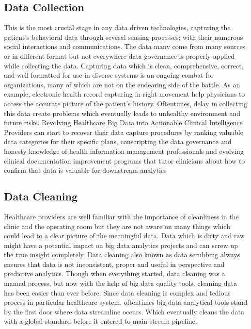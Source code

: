 \documentclass[sigconf]{acmart}
\begin{document}
\subsection{Data Collection} This is the most crucial stage in any data driven technologies, capturing the patient’s behavioral data through several sensing processes; with their numerous social interactions and communications.  The data many come from many sources or in different format but not everywhere data governance is properly applied while collecting the data. Capturing data which is clean, comprehensive, correct, and well formatted for use in diverse systems is an ongoing combat for organizations, many of which are not on the endearing side of the battle. As an example, electronic health record capturing in right movement help physicians to access the accurate picture of the patient’s history. Oftentimes, delay in collecting this data create problems which eventually leads to unhealthy environment and future risks. Revolving Healthcare Big Data into Actionable Clinical Intelligence Providers can start to recover their data capture procedures by ranking valuable data categories for their specific plans, conscripting the data governance and honesty knowledge of health information management professionals and evolving clinical documentation improvement programs that tutor clinicians about how to confirm that data is valuable for downstream analytics \cite{editor03}


\subsection{Data Cleaning} Healthcare providers are well familiar with the importance of cleanliness in the clinic and the operating room but they are not aware on many things which could lead to a clear picture of the meaningful data. Data which is dirty and raw might have a potential impact on big data analytics projects and can screw up the true insight completely.  
Data cleaning also known as data scrubbing always ensures that data is not inconsistent, proper and useful in perspective and predictive analytics. Though when everything started, data cleaning was a manual process, but now with the help of big data quality tools, cleaning data has been easier than ever before. Since data cleaning is complex and tedious process in particular healthcare system, oftentimes big data analytical tools stand by the first door where data streamline occurs. Which eventually cleans the data with a global standard before it entered to main stream pipeline.
\end{document}
